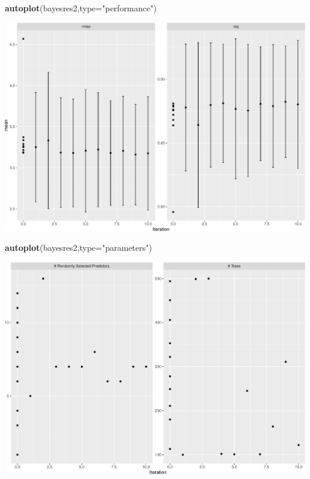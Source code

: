 \documentclass[
  ignorenonframetext,
]{beamer}
\newenvironment{Shaded}{\begin{snugshade}}{\end{snugshade}}
\newcommand{\DataTypeTok}[1]{\textcolor[rgb]{0.13,0.29,0.53}{#1}}
\newcommand{\KeywordTok}[1]{\textcolor[rgb]{0.13,0.29,0.53}{\textbf{#1}}}
\newcommand{\NormalTok}[1]{#1}
\newcommand{\StringTok}[1]{\textcolor[rgb]{0.31,0.60,0.02}{#1}}
\begin{document}
\begin{frame}[fragile]
\begin{Shaded}
\begin{Highlighting}[]
\KeywordTok{autoplot}\NormalTok{(bayesres2,}\DataTypeTok{type=}\StringTok{"performance"}\NormalTok{)}
\end{Highlighting}
\end{Shaded}

\includegraphics{L7_files/figure-beamer/unnamed-chunk-11-1.pdf}

\begin{Shaded}
\begin{Highlighting}[]
\KeywordTok{autoplot}\NormalTok{(bayesres2,}\DataTypeTok{type=}\StringTok{"parameters"}\NormalTok{)}
\end{Highlighting}
\end{Shaded}

\includegraphics{L7_files/figure-beamer/unnamed-chunk-11-2.pdf}

\end{frame}
\end{document}
